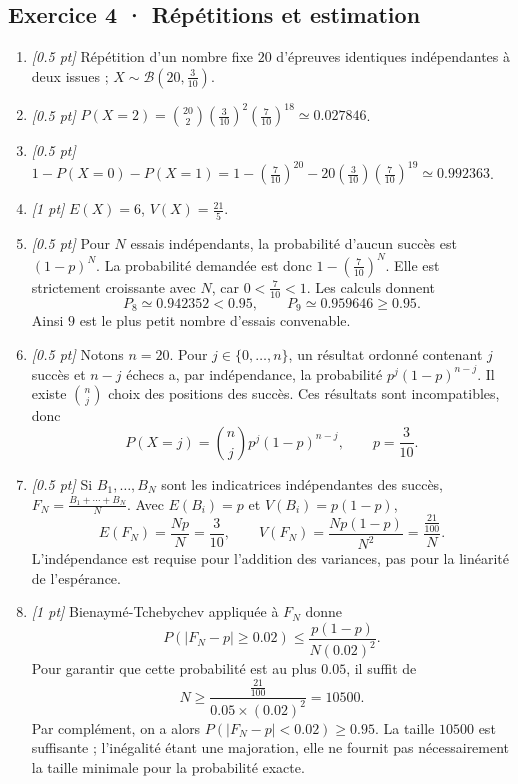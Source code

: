 \subsection*{Exercice 4 · Répétitions et estimation}\begin{enumerate}

\item \textit{[\num{0,5} pt]} Répétition d'un nombre fixe $20$ d'épreuves identiques indépendantes à deux issues ; $X\sim\mathcal B(20,\frac{3}{10})$.

\item \textit{[\num{0,5} pt]} $P(X=2)=\binom{20}2(\frac{3}{10})^2(\frac{7}{10})^{18}\simeq\num{0,027846}$.

\item \textit{[\num{0,5} pt]} $1-P(X=0)-P(X=1)=1-(\frac{7}{10})^{20}-20(\frac{3}{10})(\frac{7}{10})^{19}\simeq\num{0,992363}$.

\item \textit{[1 pt]} $E(X)=6$, $V(X)=\frac{21}{5}$.

\item \textit{[\num{0,5} pt]} Pour $N$ essais indépendants, la probabilité d'aucun succès est $(1-p)^N$. La probabilité demandée est donc $1-(\frac{7}{10})^N$. Elle est strictement croissante avec $N$, car $0<\frac{7}{10}<1$. Les calculs donnent
\[P_{8}\simeq\num{0,942352}<\num{0,95},\qquad P_{9}\simeq\num{0,959646}\ge\num{0,95}.\]
Ainsi $9$ est le plus petit nombre d'essais convenable.

\item \textit{[\num{0,5} pt]} Notons $n=20$. Pour $j\in\{0,\ldots,n\}$, un résultat ordonné contenant $j$ succès et $n-j$ échecs a, par indépendance, la probabilité $p^j(1-p)^{n-j}$. Il existe $\binom nj$ choix des positions des succès. Ces résultats sont incompatibles, donc
\[P(X=j)=\binom nj p^j(1-p)^{n-j},\qquad p=\frac{3}{10}.\]

\item \textit{[\num{0,5} pt]} Si $B_1,\ldots,B_N$ sont les indicatrices indépendantes des succès, $F_N=\frac{B_1+\cdots+B_N}{N}$. Avec $E(B_i)=p$ et $V(B_i)=p(1-p)$,
\[E(F_N)=\frac{Np}{N}=\frac{3}{10},\qquad V(F_N)=\frac{Np(1-p)}{N^2}=\frac{\frac{21}{100}}{N}.\]
L'indépendance est requise pour l'addition des variances, pas pour la linéarité de l'espérance.

\item \textit{[1 pt]} Bienaymé-Tchebychev appliquée à $F_N$ donne
\[P(|F_N-p|\ge\num{0,02})\le\frac{p(1-p)}{N(\num{0,02})^2}.\]
Pour garantir que cette probabilité est au plus $\num{0,05}$, il suffit de
\[N\ge\frac{\frac{21}{100}}{\num{0,05}\times(\num{0,02})^2}=10500.\]
Par complément, on a alors $P(|F_N-p|<\num{0,02})\ge\num{0,95}$. La taille $10500$ est suffisante ; l'inégalité étant une majoration, elle ne fournit pas nécessairement la taille minimale pour la probabilité exacte.

\end{enumerate}

\fi

\fi

